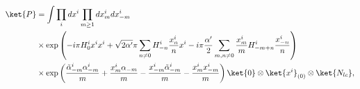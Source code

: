 \begin{equation}
\begin{split}
 \ket{P} &= \int \prod_i dx^i \prod_{m \geq 1} dx^i_m dx^i_{-m} \\
  &\times \exp \left( - i \pi H^i_0 x^ix^i 
   + \sqrt{2 \alpha'}\pi\sum_{n \neq 0}  H^i_{-n} \frac{x^i_n}{n} x^i 
 - i \pi \frac{\alpha'}{2} \sum_{m,n \neq 0} 
   \frac{x^i_m}{m} H^i_{-m+n} \frac{x^i_{-n}}{n} \right) \\
  & \times \exp \left( \frac{\tilde \alpha^i_{-m}  \alpha^i_{-m}}{m}
  + \frac{x^i_m \alpha_{-m}}{m} - \frac{x^i_{-m}{\tilde \alpha^i_{-m}}}{m}
  - \frac{x^i_m x^i_{-m}}{m} \right) \ket{0} \otimes \ket{x^i}_{(0)} 
   \otimes 
  \ket{N_{lc}} ,
\end{split}
\end{equation}

